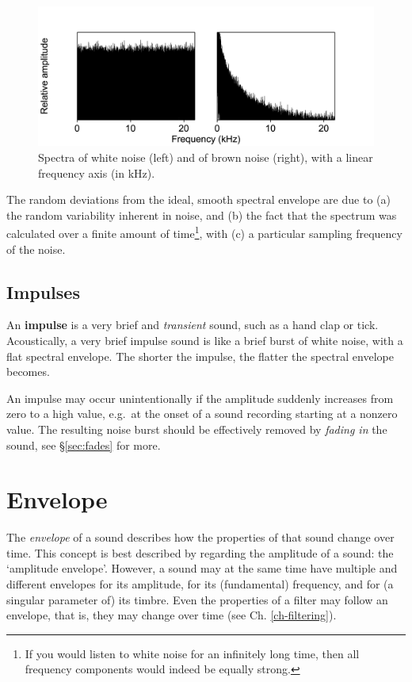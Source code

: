 \documentclass[
]{book}
\begin{document}
\begin{figure}

{\centering \includegraphics{figures/whitebrownnoises} 

}

\caption{Spectra of white noise (left) and of brown noise (right), with a linear frequency axis (in kHz).}\label{fig:spectrum-whitebrownnoises}
\end{figure}

The random deviations from the ideal, smooth spectral envelope are due to (a) the random variability inherent in noise, and (b) the fact that the spectrum was calculated over a finite amount of time\footnote{If you would listen to white noise for an infinitely long time, then all frequency components would indeed be equally strong.}, with (c) a particular sampling frequency of the noise.

\subsection{Impulses}\label{sec:impulses}

An \textbf{impulse} is a very brief and \emph{transient} sound, such as a hand clap or tick. Acoustically, a very brief impulse sound is like a brief burst of white noise, with a flat spectral envelope. The shorter the impulse, the flatter the spectral envelope becomes.

An impulse may occur unintentionally if the amplitude suddenly increases from zero to a high value, e.g.~at the onset of a sound recording starting at a nonzero value. The resulting noise burst should be effectively removed by \emph{fading in} the sound, see §\ref{sec:fades} for more.

\section{Envelope}\label{sec:envelope}

The \emph{envelope} of a sound describes how the properties of that sound change over time. This concept is best described by regarding the amplitude of a sound: the `amplitude envelope'. However, a sound may at the same time have multiple and different envelopes for its amplitude, for its (fundamental) frequency, and for (a singular parameter of) its timbre. Even the properties of a filter may follow an envelope, that is, they may change over time (see Ch. \ref{ch-filtering}).
\end{document}
